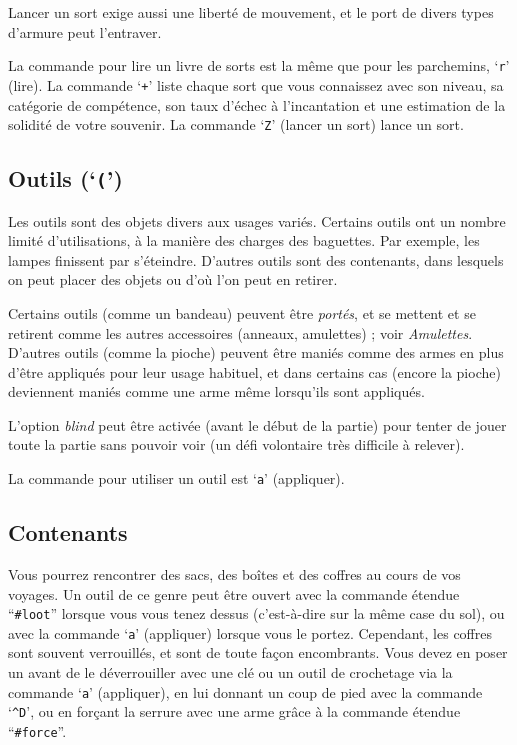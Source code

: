 \documentclass[titlepage]{article}
\begin{document}
Lancer un sort exige aussi une liberté de mouvement, et le port de divers types
d'armure peut l'entraver.

La commande pour lire un livre de sorts est la même que pour les parchemins, `\texttt{r}' (lire).
La commande `\texttt{+}' liste chaque sort que vous connaissez avec son niveau, sa catégorie
de compétence, son taux d'échec à l'incantation et une estimation de la solidité
de votre souvenir.
La commande `\texttt{Z}' (lancer un sort) lance un sort.

\subsection*{Outils (`\texttt{(}')}

Les outils sont des objets divers aux usages variés.  Certains outils
ont un nombre limité d'utilisations, à la manière des charges des baguettes.  Par
exemple, les lampes finissent par s'éteindre.  D'autres outils sont des contenants,
dans lesquels on peut placer des objets ou d'où l'on peut en retirer.

Certains outils (comme un bandeau) peuvent être \textit{portés}, et se mettent et
se retirent comme les autres accessoires (anneaux, amulettes) ; voir \textit{Amulettes}.
D'autres outils (comme la pioche) peuvent être maniés comme des armes en plus
d'être appliqués pour leur usage habituel, et dans certains cas (encore la pioche)
deviennent maniés comme une arme même lorsqu'ils sont appliqués.

L'option \textit{blind}
peut être activée (avant le début de la partie) pour tenter de jouer toute la
partie sans pouvoir voir (un défi volontaire
très difficile à relever).

La commande pour utiliser un outil est `\texttt{a}' (appliquer).

\subsection*{Contenants}

Vous pourrez rencontrer des sacs, des boîtes et des coffres au cours de vos voyages.  Un outil de
ce genre peut être ouvert avec la commande étendue ``\texttt{\#loot}'' lorsque
vous vous tenez dessus (c'est-à-dire sur la même case du sol),
ou avec la commande `\texttt{a}' (appliquer) lorsque vous le portez.  Cependant,
les coffres sont souvent verrouillés, et sont de toute façon encombrants.
Vous devez en poser un avant de le déverrouiller
avec une clé ou un outil de crochetage via la commande `\texttt{a}' (appliquer),
en lui donnant un coup de pied avec la commande `\texttt{\textasciicircum D}',
ou en forçant la serrure avec une arme grâce à la commande étendue
``\texttt{\#force}''.
\end{document}

